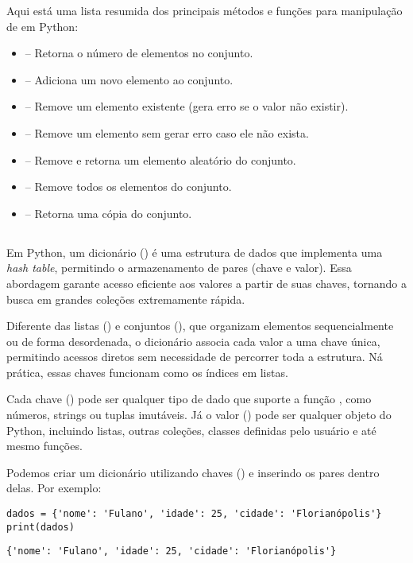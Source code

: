 Aqui está uma lista resumida dos principais métodos e funções para manipulação de  em Python:
\begin{itemize}
\item {} -- Retorna o número de elementos no conjunto.
\item {} -- Adiciona um novo elemento ao conjunto.
\item {} -- Remove um elemento existente (gera erro se o valor não existir).
\item {} -- Remove um elemento sem gerar erro caso ele não exista.
\item {} -- Remove e retorna um elemento aleatório do conjunto.
\item {} -- Remove todos os elementos do conjunto.
\item {} -- Retorna uma cópia do conjunto.
\end{itemize}


\subsection{}

Em Python, um dicionário () é uma estrutura de dados que implementa uma \emph{hash table}, permitindo o armazenamento de pares
 (chave e valor).
Essa abordagem garante acesso eficiente aos valores a partir de suas chaves, tornando a busca em grandes coleções
extremamente rápida.

Diferente das listas () e conjuntos (), que organizam elementos sequencialmente ou de forma desordenada,
o dicionário associa cada valor a uma chave única, permitindo acessos diretos sem necessidade de percorrer toda a
estrutura. Ná prática, essas chaves funcionam como os índices em listas.

Cada chave () pode ser qualquer tipo de dado que suporte a função , como números, strings
ou tuplas imutáveis.
Já o valor () pode ser qualquer objeto do Python, incluindo listas, outras coleções, classes definidas
pelo usuário e até mesmo funções.

Podemos criar um dicionário utilizando chaves (\inlcode{\{\}}) e inserindo os pares  dentro delas.
Por exemplo:
\begin{verbatim}
dados = {'nome': 'Fulano', 'idade': 25, 'cidade': 'Florianópolis'}
print(dados)
\end{verbatim}
\begin{verbatim}
{'nome': 'Fulano', 'idade': 25, 'cidade': 'Florianópolis'}
\end{verbatim}


